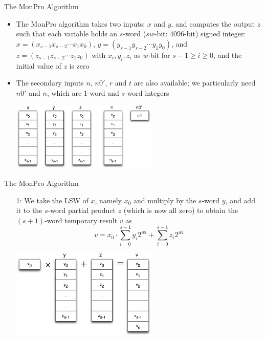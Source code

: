 \documentclass[xcolor=dvipsnames]{beamer}
\begin{document}
\begin{frame}{The MonPro Algorithm}
\begin{itemize}

\item The MonPro algorithm takes two inputs: $x$ and $y$,
and computes the output $z$ such that each variable 
holds an $s$-word ($sw$-bit: 4096-bit) signed integer:
$x=(x_{s-1}x_{s-2}\cdots x_1x_0)$,
$y=(y_{s-1}y_{s-2}\cdots y_1y_0)$, and 
$z=(z_{s-1}z_{s-2}\cdots z_1z_0)$ with $x_i,y_i,z_i$ as $w$-bit
for $s-1 \geq i \geq 0$, and the initial value of $z$ is zero

\item The secondary inputs $n$, $n0'$, $r$ and $t$ are also available;
we particularly need $n0'$ and $n$, which are $1$-word and $s$-word integers

\centerline{\includegraphics[width=7cm]{mp0.eps}}

\end{itemize}
\end{frame}

\begin{frame}{The MonPro Algorithm}
\begin{enumerate}

\item[1:] We take the LSW of $x$, namely $x_0$ and multiply by the $s$-word $y$,
and add it to the $s$-word partial product $z$ (which is now all zero) to  obtain
the $(s+1)$-word temporary result $v$ as
\[
v = x_0 \cdot \sum_{i=0}^{s-1} y_i 2^{wi} + \sum_{i=0}^{s-1} z_i 2^{wi}
\]

\centerline{\includegraphics[width=7cm]{mp1.eps}}

\end{enumerate}
\end{frame}
\end{document}
